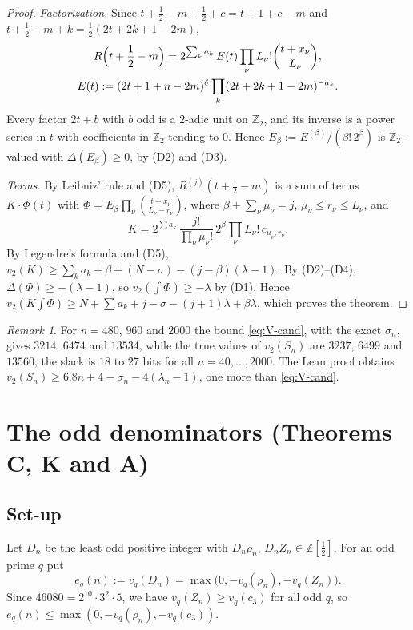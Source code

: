 \documentclass{amsart}
\theoremstyle{definition}
\theoremstyle{remark}
\newtheorem{remark}[theorem]{Remark}
\numberwithin{equation}{section}
\newcommand{\Z}{\mathbb{Z}}
\begin{document}
\begin{proof}
\emph{Factorization.} Since
$t+\frac12-m+\frac12+c=t+1+c-m$ and
$t+\frac12-m+k=\frac12(2t+2k+1-2m)$,
\begin{gather*}
  R\Bigl(t+\frac12-m\Bigr)=2^{\sum_ka_k}\,E(t)\prod_\nu L_\nu!\binom{t+x_\nu}{L_\nu},\\
  E(t):=(2t+1+n-2m)^\delta\prod_k(2t+2k+1-2m)^{-a_k}.
\end{gather*}
Every factor $2t+b$ with $b$ odd is a $2$-adic unit on $\Z_2$, and its
inverse is a power series in $t$ with coefficients in $\Z_2$ tending to $0$.
Hence $E_\beta:=E^{(\beta)}/(\beta!\,2^\beta)$ is $\Z_2$-valued with
$\Delta(E_\beta)\ge0$, by (D2) and (D3).

\emph{Terms.} By Leibniz' rule and (D5), $R^{(j)}(t+\frac12-m)$ is a sum of
terms $K\cdot\Phi(t)$ with
$\Phi=E_\beta\prod_\nu\binom{t+x_\nu}{L_\nu-r_\nu}$, where $\beta+\sum_\nu\mu_\nu=j$,
$\mu_\nu\le r_\nu\le L_\nu$, and
\[
  K=2^{\sum a_k}\,\frac{j!}{\prod_\nu\mu_\nu!}\,2^\beta\prod_\nu L_\nu!\,c_{\mu_\nu,r_\nu}.
\]
By Legendre's formula and (D5),
$v_2(K)\ge\sum_ka_k+\beta+(N-\sigma)-(j-\beta)(\lambda-1)$. By (D2)--(D4),
$\Delta(\Phi)\ge-(\lambda-1)$, so $v_2(\int\Phi)\ge-\lambda$ by (D1). Hence
$v_2(K\int\Phi)\ge N+\sum a_k+j-\sigma-(j+1)\lambda+\beta\lambda$, which
proves the theorem.
\end{proof}

\begin{remark}\label{rem:V-sharp}
For $n=480$, $960$ and $2000$ the bound \eqref{eq:V-cand}, with the exact
$\sigma_n$, gives $3214$, $6474$ and $13534$, while the true values of
$v_2(S_n)$ are $3237$, $6499$ and $13560$; the slack is $18$ to $27$ bits for
all $n=40,\dots,2000$. The Lean proof obtains $v_2(S_n)\ge6.8n+4-\sigma_n-4(\lambda_n-1)$,
one more than \eqref{eq:V-cand}.
\end{remark}

\section{The odd denominators (Theorems C, K and A)}\label{sec:den}

\subsection{Set-up}\label{ss:den-setup}

Let $D_n$ be the least odd positive integer with
$D_n\rho_n,\,D_nZ_n\in\Z[\frac12]$. For an odd prime $q$ put
\[
  e_q(n):=v_q(D_n)=\max\bigl(0,-v_q(\rho_n),-v_q(Z_n)\bigr).
\]
Since $46080=2^{10}\cdot3^2\cdot5$, we have $v_q(Z_n)\ge v_q(c_3)$ for all odd
$q$, so $e_q(n)\le\max(0,-v_q(\rho_n),-v_q(c_3))$.
\end{document}
